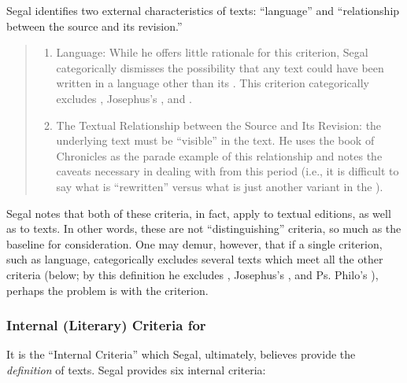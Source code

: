 Segal identifies two external characteristics of \rwb texts: ``language'' and ``relationship between the source and its revision.'' 
\begin{quote}
\begin{enumerate}
    \item Language: While he offers little rationale for this criterion, Segal categorically dismisses the possibility that any \rwb text could have been written in a language other than its \vorlage. This criterion categorically excludes \ga, Josephus's \ant, and \lab.

    \item The Textual Relationship between the Source and Its Revision: the underlying text must be ``visible'' in the \rwb text. He uses the book of Chronicles as the parade example of this relationship and notes the caveats necessary in dealing with \vorlagen from this period (i.e., it is difficult to say what is ``rewritten'' versus what is just another variant in the \vorlage).
\end{enumerate} 
\end{quote}
\noindent
Segal notes that both of these criteria, in fact, apply to textual editions, as well as to \rwb texts.%
    \autocite[20]{segal_henze2005}
In other words, these are not ``distinguishing'' criteria, so much as the baseline for consideration. One may demur, however, that if a single criterion, such as language, categorically excludes several texts which meet all the other criteria (below; by this definition he excludes \ga, Josephus's \ant, and Ps. Philo's \lab), perhaps the problem is with the criterion.

\subsubsection{Internal (Literary) Criteria for \rwb}

It is the ``Internal Criteria'' which Segal, ultimately, believes provide the \emph{definition} of \rwb texts.%
    \autocite[20]{segal_henze2005}
Segal provides six internal criteria: 

